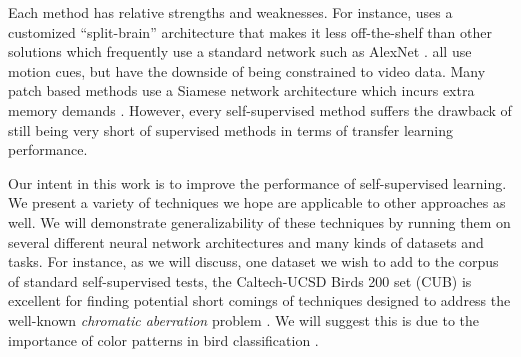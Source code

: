 \documentclass[10pt,twocolumn,letterpaper]{article}
\begin{document}
Each method has relative strengths and weaknesses. For instance, \cite{Zhang17} uses a customized ``split-brain'' architecture that makes it less off-the-shelf than other solutions which frequently use a standard network such as AlexNet \cite{AlexNet}. \cite{Wang15b,Wang17,Lee17,Pathak17} all use motion cues, but have the downside of being constrained to video data.  Many patch based methods use a Siamese network architecture which incurs extra memory demands \cite{Doersch15,Noroozi16a,Noroozi17,Lee17}. However, every self-supervised method suffers the drawback of still being very short of supervised methods in terms of transfer learning performance. 

Our intent in this work is to improve the performance of self-supervised learning. We present a variety of techniques we hope are applicable to other approaches as well. We will demonstrate generalizability of these techniques by running them on several different neural network architectures and many kinds of datasets and tasks.  For instance, as we will discuss, one dataset we wish to add to the corpus of standard self-supervised tests, the Caltech-UCSD Birds 200 set (CUB) \cite{Welinder10} is excellent for finding potential short comings of techniques designed to address the well-known \emph{chromatic aberration} problem \cite{Doersch15}. We will suggest this is due to the importance of color patterns in bird classification \cite{Cornell09}.  

\end{document}
